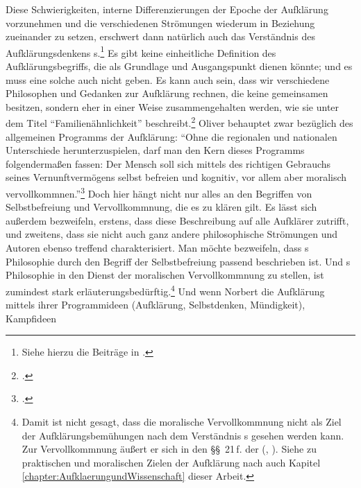 Diese Schwierigkeiten, interne Differenzierungen der Epoche der Aufklärung
vorzunehmen und die verschiedenen Strömungen wiederum in Beziehung zueinander zu
setzen, erschwert dann natürlich auch das Verständnis des Aufklärungsdenkens
s.\footnote{Siehe hierzu die Beiträge in
\cite{Emundts:ImmanuelKantunddieBerlinerAufklaerung2000}.} Es gibt keine einheitliche
Definition des Aufklärungsbegriffs, die als Grundlage und Ausgangspunkt dienen
könnte; und es muss eine solche auch nicht geben. Es kann auch sein, dass wir
verschiedene Philosophen und Gedanken zur Aufklärung rechnen, die keine
gemeinsamen  besitzen, sondern eher in einer Weise
zusammengehalten werden, wie sie  unter dem Titel
\enquote{Familienähnlichkeit}
beschreibt.\footcite[Vgl.][\S\S~65--67]{Wittgenstein:PhilosophischeUntersuchungen2003}
Oliver  behauptet zwar bezüglich des
allgemeinen Programms der Aufklärung:
\enquote{Ohne die regionalen und nationalen Unterschiede herunterzuspielen, darf
man den Kern dieses Programms folgendermaßen fassen: Der Mensch soll sich
mittels des richtigen Gebrauchs seines Vernunftvermögens selbst befreien und
kognitiv, vor allem aber moralisch
vervollkommnen.}\footcite[][28]{Scholz:KantsAufklaerungsprogramm2009} Doch hier
hängt nicht nur alles an den Begriffen von Selbstbefreiung und Vervollkommnung,
die es zu klären gilt. Es lässt sich außerdem bezweifeln, erstens, dass diese
Beschreibung auf alle Aufklärer zutrifft, und zweitens, dass sie nicht auch ganz
andere philosophische Strömungen und Autoren ebenso treffend charakterisiert.
Man möchte bezweifeln, dass
s
Philosophie durch den Begriff der Selbstbefreiung passend beschrieben ist. Und
s Philosophie in den Dienst der moralischen Vervollkommnung
zu stellen, ist zumindest stark erläuterungsbedürftig.\footnote{Damit ist nicht
gesagt, dass die moralische Vervollkommnung nicht als Ziel der
Aufklärungsbemühungen nach dem Verständnis s gesehen
werden kann. Zur Vervollkommnung äußert er sich in den \S\S~21\,f. der
\mkbibparens{\cite[vgl.][A 113--115]{Kant:DieMetaphysikderSitten1977Tugendlehre},
\cite[][VI: 446.9--447.17]{Kant:GesammelteWerke1900ff.}}.
Siehe zu praktischen und moralischen Zielen der Aufklärung nach
 auch Kapitel \ref{chapter:AufklaerungundWissenschaft}
dieser Arbeit.} Und wenn Norbert  die Aufklärung mittels
ihrer Programmideen (Aufklärung, Selbstdenken, Mündigkeit), Kampfideen
